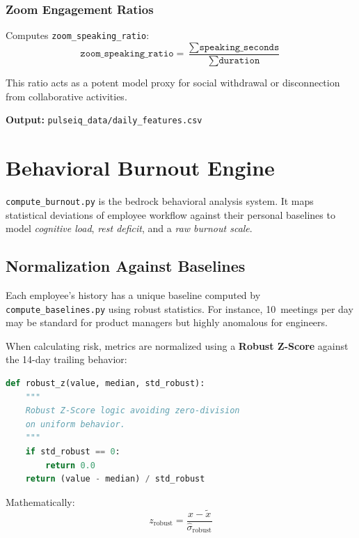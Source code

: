 \documentclass[12pt, a4paper, oneside]{report}
\begin{document}
\subsection{Zoom Engagement Ratios}

Computes \texttt{zoom\_speaking\_ratio}:
\[
    \texttt{zoom\_speaking\_ratio} = \frac{\sum \texttt{speaking\_seconds}}{\sum \texttt{duration}}
\]

This ratio acts as a potent model proxy for social withdrawal or disconnection from collaborative activities.

\textbf{Output:} \texttt{pulseiq\_data/daily\_features.csv}


\chapter{Behavioral Burnout Engine}
\label{ch:burnout}

\texttt{compute\_burnout.py} is the bedrock behavioral analysis system. It maps statistical deviations of employee workflow against their personal baselines to model \emph{cognitive load}, \emph{rest deficit}, and a \emph{raw burnout scale}.

\section{Normalization Against Baselines}
\label{sec:baselines}

Each employee's history has a unique baseline computed by \texttt{compute\_baselines.py} using robust statistics. For instance, 10~meetings per day may be standard for product managers but highly anomalous for engineers.

When calculating risk, metrics are normalized using a \textbf{Robust Z-Score} against the 14-day trailing behavior:

\begin{lstlisting}[language=Python, caption={Robust Z-Score normalization}]
def robust_z(value, median, std_robust):
    """
    Robust Z-Score logic avoiding zero-division
    on uniform behavior.
    """
    if std_robust == 0:
        return 0.0
    return (value - median) / std_robust
\end{lstlisting}

Mathematically:
\[
    z_{\text{robust}} = \frac{x - \tilde{x}}{\hat{\sigma}_{\text{robust}}}
\]
\end{document}
